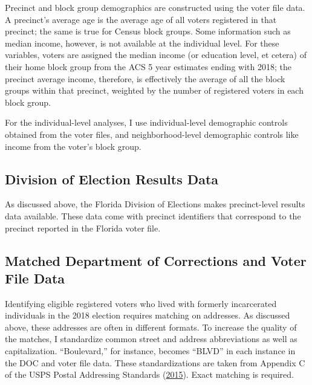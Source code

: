 \documentclass[
  12pt,
]{article}
\begin{document}
Precinct and block group demographics are constructed using the voter file data. A precinct's average age is the average age of all voters registered in that precinct; the same is true for Census block groups. Some information such as median income, however, is not available at the individual level. For these variables, voters are assigned the median income (or education level, et cetera) of their home block group from the ACS 5 year estimates ending with 2018; the precinct average income, therefore, is effectively the average of all the block groups within that precinct, weighted by the number of registered voters in each block group.

For the individual-level analyses, I use individual-level demographic controls obtained from the voter files, and neighborhood-level demographic controls like income from the voter's block group.

\hypertarget{division-of-election-results-data}{%
\subsection*{Division of Election Results Data}\label{division-of-election-results-data}}

As discussed above, the Florida Division of Elections makes precinct-level results data available. These data come with precinct identifiers that correspond to the precinct reported in the Florida voter file.

\hypertarget{matched-department-of-corrections-and-voter-file-data}{%
\subsection*{Matched Department of Corrections and Voter File Data}\label{matched-department-of-corrections-and-voter-file-data}}

Identifying eligible registered voters who lived with formerly incarcerated individuals in the 2018 election requires matching on addresses. As discussed above, these addresses are often in different formats. To increase the quality of the matches, I standardize common street and address abbreviations as well as capitalization. ``Boulevard,'' for instance, becomes ``BLVD'' in each instance in the DOC and voter file data. These standardizations are taken from Appendix C of the USPS Postal Addressing Standards (\protect\hyperlink{ref-USPS2015}{2015}). Exact matching is required.
\end{document}

